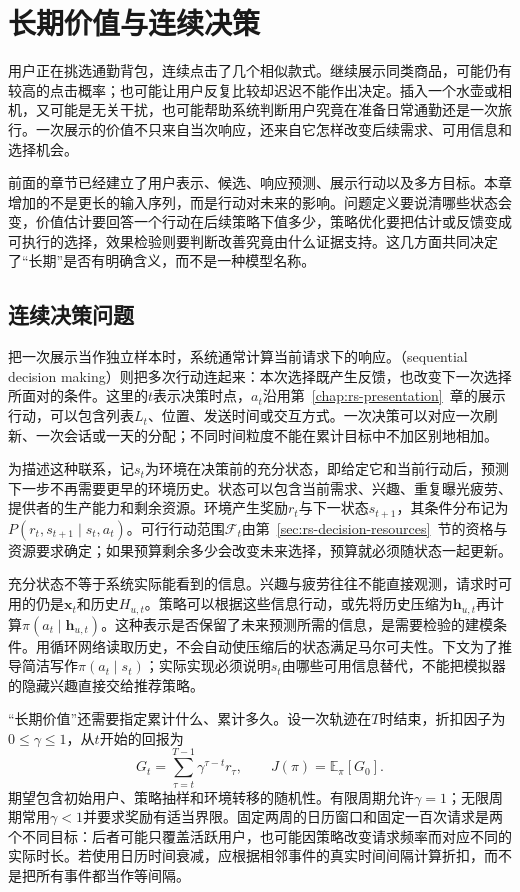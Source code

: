\chapter{长期价值与连续决策}
\label{chap:rs-long-term}

用户正在挑选通勤背包，连续点击了几个相似款式。继续展示同类商品，可能仍有较高的点击概率；也可能让用户反复比较却迟迟不能作出决定。插入一个水壶或相机，又可能是无关干扰，也可能帮助系统判断用户究竟在准备日常通勤还是一次旅行。一次展示的价值不只来自当次响应，还来自它怎样改变后续需求、可用信息和选择机会。

前面的章节已经建立了用户表示、候选、响应预测、展示行动以及多方目标。本章增加的不是更长的输入序列，而是行动对未来的影响。问题定义要说清哪些状态会变，价值估计要回答一个行动在后续策略下值多少，策略优化要把估计或反馈变成可执行的选择，效果检验则要判断改善究竟由什么证据支持。这几方面共同决定了“长期”是否有明确含义，而不是一种模型名称。

\section{连续决策问题}
\label{sec:rs-sequential-problem}

把一次展示当作独立样本时，系统通常计算当前请求下的响应。（sequential decision making）则把多次行动连起来：本次选择既产生反馈，也改变下一次选择所面对的条件。这里的$t$表示决策时点，$a_t$沿用第~\ref{chap:rs-presentation}~章的展示行动，可以包含列表$L_t$、位置、发送时间或交互方式。一次决策可以对应一次刷新、一次会话或一天的分配；不同时间粒度不能在累计目标中不加区别地相加。

为描述这种联系，记$s_t$为环境在决策前的充分状态，即给定它和当前行动后，预测下一步不再需要更早的环境历史。状态可以包含当前需求、兴趣、重复曝光疲劳、提供者的生产能力和剩余资源。环境产生奖励$r_t$与下一状态$s_{t+1}$，其条件分布记为$P(r_t,s_{t+1}\mid s_t,a_t)$。可行行动范围$\mathcal{F}_t$由第~\ref{sec:rs-decision-resources}~节的资格与资源要求确定；如果预算剩余多少会改变未来选择，预算就必须随状态一起更新。

充分状态不等于系统实际能看到的信息。兴趣与疲劳往往不能直接观测，请求时可用的仍是$\bm{x}_t$和历史$H_{u,t}$。策略可以根据这些信息行动，或先将历史压缩为$\bm{h}_{u,t}$再计算$\pi(a_t\mid\bm{h}_{u,t})$。这种表示是否保留了未来预测所需的信息，是需要检验的建模条件。用循环网络读取历史，不会自动使压缩后的状态满足马尔可夫性。下文为了推导简洁写作$\pi(a_t\mid s_t)$；实际实现必须说明$s_t$由哪些可用信息替代，不能把模拟器的隐藏兴趣直接交给推荐策略。

“长期价值”还需要指定累计什么、累计多久。设一次轨迹在$T$时结束，折扣因子为$0\leq\gamma\leq1$，从$t$开始的回报为
\begin{equation}
 G_t=\sum_{\tau=t}^{T-1}\gamma^{\tau-t}r_\tau,
 \qquad
 J(\pi)=\mathbb{E}_{\pi}[G_0].
 \label{eq:rs-long-term-return}
\end{equation}
期望包含初始用户、策略抽样和环境转移的随机性。有限周期允许$\gamma=1$；无限周期常用$\gamma<1$并要求奖励有适当界限。固定两周的日历窗口和固定一百次请求是两个不同目标：后者可能只覆盖活跃用户，也可能因策略改变请求频率而对应不同的实际时长。若使用日历时间衰减，应根据相邻事件的真实时间间隔计算折扣，而不是把所有事件都当作等间隔。

